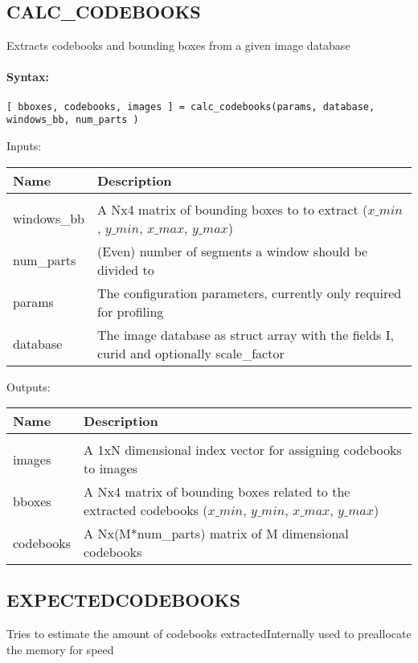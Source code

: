 \subsection{CALC\_CODEBOOKS}

Extracts codebooks and bounding boxes from a given image database

\paragraph{Syntax:} \verb|[ bboxes, codebooks, images ] = calc_codebooks(params, database, windows_bb, num_parts )|

Inputs:

\begin{tabular}{|l|p{5cm}|}
\hline
\textbf{Name} & \textbf{Description} \\
\hline \hline \\
windows\_bb & A Nx4 matrix of bounding boxes to to extract ($x\_{min}$, $y\_{min}$, $x\_{max}$, $y\_{max}$)  \\ \hline
num\_parts & (Even) number of segments a window should be divided to  \\ \hline
params & The configuration parameters, currently only required for profiling  \\ \hline
database & The image database as struct array with the fields I, curid and optionally scale\_factor  \\ \hline
\end{tabular}
Outputs:

\begin{tabular}{|l|p{5cm}|}
\hline
\textbf{Name} & \textbf{Description} \\
\hline \hline \\
images & A 1xN dimensional index vector for assigning codebooks to images  \\ \hline
bboxes & A Nx4 matrix of bounding boxes related to the extracted codebooks ($x\_{min}$, $y\_{min}$, $x\_{max}$, $y\_{max}$)  \\ \hline
codebooks & A Nx(M*num\_parts) matrix of M dimensional codebooks  \\ \hline
\end{tabular}

\subsection{EXPECTEDCODEBOOKS}

Tries to estimate the amount of codebooks extractedInternally used to preallocate the memory for speed

